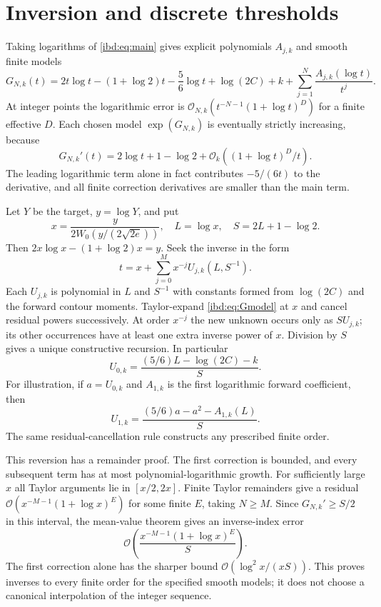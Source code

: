\documentclass[11pt,letterpaper]{article}
\theoremstyle{remark}\newtheorem{remark}[theorem]{Remark}
\newcommand{\Oh}{\mathcal O}
\begin{document}
\section{Inversion and discrete thresholds}\label{ibd:sec:inverse}
Taking logarithms of \eqref{ibd:eq:main} gives explicit polynomials $A_{j,k}$ and smooth finite models
\begin{equation}\label{ibd:eq:Gmodel}
 G_{N,k}(t)=2t\log t-(1+\log2)t-\frac56\log t+\log(2C)+k
       +\sum_{j=1}^N\frac{A_{j,k}(\log t)}{t^j}.
\end{equation}
At integer points the logarithmic error is
$\Oh_{N,k}(t^{-N-1}(1+\log t)^D)$ for a finite effective $D$. Each chosen model $\exp(G_{N,k})$ is eventually strictly increasing, because
\[
 G_{N,k}'(t)=2\log t+1-\log2+\Oh_k((1+\log t)^D/t).
\]
The leading logarithmic term alone in fact contributes $-5/(6t)$ to the derivative, and all finite correction derivatives are smaller than the main term.

Let $Y$ be the target, $y=\log Y$, and put
\begin{equation}\label{ibd:eq:inversecore}
 x=\frac{y}{2W_0(y/(2\sqrt{2e}))},\quad L=\log x,\quad S=2L+1-\log2.
\end{equation}
Then $2x\log x-(1+\log2)x=y$. Seek the inverse in the form
\begin{equation}\label{ibd:eq:inverseansatz}
 t=x+\sum_{j=0}^M x^{-j}U_{j,k}(L,S^{-1}).
\end{equation}
Each $U_{j,k}$ is polynomial in $L$ and $S^{-1}$ with constants formed from $\log(2C)$ and the forward contour moments. Taylor-expand \eqref{ibd:eq:Gmodel} at $x$ and cancel residual powers successively. At order $x^{-j}$ the new unknown occurs only as $S U_{j,k}$; its other occurrences have at least one extra inverse power of $x$. Division by $S$ gives a unique constructive recursion. In particular
\begin{equation}\label{ibd:eq:inversefirst}
 U_{0,k}=\frac{(5/6)L-\log(2C)-k}{S}.
\end{equation}
For illustration, if $a=U_{0,k}$ and $A_{1,k}$ is the first logarithmic forward coefficient, then
\[
 U_{1,k}=\frac{(5/6)a-a^2-A_{1,k}(L)}{S}.
\]
The same residual-cancellation rule constructs any prescribed finite order.

This reversion has a remainder proof. The first correction is bounded, and every subsequent term has at most polynomial-logarithmic growth. For sufficiently large $x$ all Taylor arguments lie in $[x/2,2x]$. Finite Taylor remainders give a residual
$\Oh(x^{-M-1}(1+\log x)^E)$ for some finite $E$, taking $N\geq M$. Since $G_{N,k}'\geq S/2$ in this interval, the mean-value theorem gives an inverse-index error
\begin{equation}\label{ibd:eq:inverseerror}
 \Oh\!\left(\frac{x^{-M-1}(1+\log x)^E}{S}\right).
\end{equation}
The first correction alone has the sharper bound
$\Oh(\log^2 x/(xS))$. This proves inverses to every finite order for the specified smooth models; it does not choose a canonical interpolation of the integer sequence.
\end{document}
